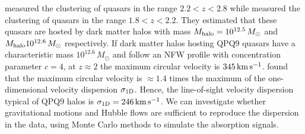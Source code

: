 \documentclass[iop]{emulateapj}
\begin{document}
\cite{Eftekharzadeh+15} measured the clustering of quasars in the range $2.2<z<2.8$ while 
\cite{RodriguezTorres+16} measured the clustering of quasars in the range $1.8<z<2.2$. They 
estimated that these quasars are hosted by dark matter halos with mass 
$M_{\rm halo}=10^{12.5}\,M_\odot$ and $M_{\rm halo}10^{12.6}\,M_\odot$ respectively. If dark 
matter halos hosting QPQ9 quasars have a characteristic mass $10^{12.6}\,M_\odot$ and follow an 
NFW profile \citep{NavarroFrenkWhite97} with concentration 
parameter $c=4$, at $z\approx2$ the maximum circular velocity is $345\,{\rm km\,s^{-1}}$. 
\cite{TormenBouchetWhite97} found that the maximum circular velocity is $\approx1.4$ times the 
maximum of the one-dimensional velocity dispersion $\sigma_{\rm 1D}$. Hence, the line-of-sight 
velocity dispersion typical of QPQ9 halos is $\sigma_{\rm 1D}=246\,{\rm km\,s^{-1}}$. We can 
investigate whether gravitational motions and Hubble flows are sufficient to reproduce the 
dispersion in the data, using Monte Carlo methods to simulate the absorption signals. 
\end{document}
